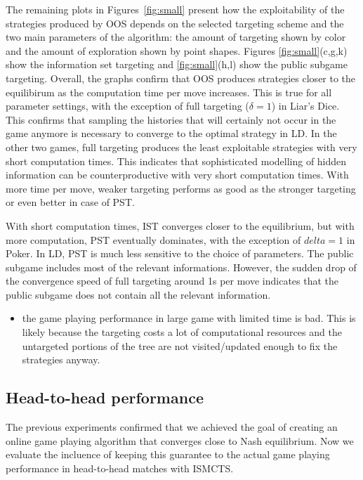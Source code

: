 \documentclass{aamas2015}
\begin{document}
The remaining plots in Figures~\ref{fig:small} present how the exploitability of the strategies produced by OOS depends on the selected targeting scheme and the two main parameters of the algorithm: the amount of targeting shown by color and the amount of exploration shown by point shapes. Figures \ref{fig:small}(c,g,k) show the information set targeting and \ref{fig:small}(h,l) show the public subgame targeting. Overall, the graphs confirm that OOS produces strategies closer to the equilibirum as the computation time per move increases. This is true for all parameter settings, with the exception of full targeting ($\delta=1$) in Liar's Dice. This confirms that sampling the histories that will certainly not occur in the game anymore is necessary to converge to the optimal strategy in LD.
In the other two games, full targeting produces the least exploitable strategies with very short computation times. This indicates that sophisticated modelling of hidden information can be counterproductive with very short computation times. With more time per move, weaker targeting performs as good as the stronger targeting or even better in case of PST.

With short computation times, IST converges closer to the equilibrium, but with more computation, PST eventually dominates, with the exception of $delta=1$ in Poker. In LD, PST is much less sensitive to the choice of parameters. The public subgame includes most of the relevant informations. However, the sudden drop of the convergence speed of full targeting around 1s per move indicates that the public subgame does not contain all the relevant information.



\begin{itemize}

\item the game playing performance in large game with limited time is bad. This is likely because the targeting costs a lot of computational resources and the untargeted portions of the tree are not visited/updated enough to fix the strategies anyway.
\end{itemize}

\subsection{Head-to-head performance}
 The previous experiments confirmed that we achieved the goal of creating an online game playing algorithm that converges close to Nash equilibrium. Now we evaluate the incluence of keeping this guarantee to the actual game playing performance in head-to-head matches with ISMCTS.
\end{document}
